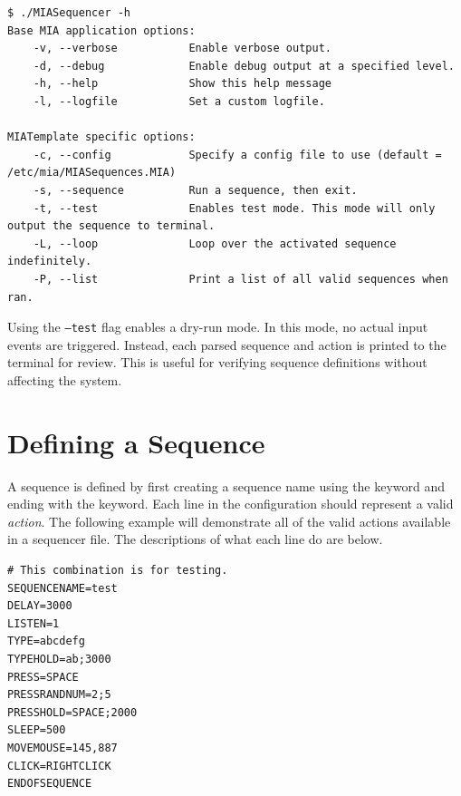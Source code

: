 \begin{lstlisting}[style=terminalstyle]
$ ./MIASequencer -h
Base MIA application options:
	-v, --verbose           Enable verbose output.
	-d, --debug             Enable debug output at a specified level.
	-h, --help              Show this help message
	-l, --logfile           Set a custom logfile.

MIATemplate specific options:
	-c, --config            Specify a config file to use (default = /etc/mia/MIASequences.MIA)
	-s, --sequence          Run a sequence, then exit.
	-t, --test              Enables test mode. This mode will only output the sequence to terminal.
	-L, --loop              Loop over the activated sequence indefinitely.
	-P, --list              Print a list of all valid sequences when ran.
\end{lstlisting}

Using the \texttt{--test} flag enables a dry-run mode. In this mode, no actual input events are triggered. Instead, each parsed sequence and action is printed to the terminal for review. This is useful for verifying sequence definitions without affecting the system.


\section{Defining a Sequence}

A sequence is defined by first creating a sequence name using the  keyword and ending with the  keyword. Each line in the configuration should represent a valid \textit{action}. The following example will demonstrate all of the valid actions available in a sequencer file. The descriptions of what each line do are below.

\begin{lstlisting}[style=pythonstyle]
# This combination is for testing.
SEQUENCENAME=test
DELAY=3000
LISTEN=1
TYPE=abcdefg
TYPEHOLD=ab;3000
PRESS=SPACE
PRESSRANDNUM=2;5
PRESSHOLD=SPACE;2000
SLEEP=500
MOVEMOUSE=145,887
CLICK=RIGHTCLICK
ENDOFSEQUENCE
\end{lstlisting}

